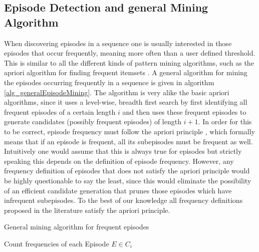 \subsection{Episode Detection and general Mining Algorithm}
When discovering episodes in a sequence one is usually interested in those episodes that occur frequently, meaning more often than a user defined threshold. This is similar to all the different kinds of pattern mining algorithms, such as the apriori algorithm for finding frequent itemsets \cite{agrawal1994fast}. A general algorithm for mining the episodes occurring frequently in a sequence is given in algorithm \ref{alg_generalEpisodeMining}. The algorithm is very alike the basic apriori algorithms, since it uses a level-wise, breadth first search by first identifying all frequent episodes of a certain length $i$ and then uses these frequent episodes to generate candidates (possibly frequent episodes) of length $i+1$. In order for this to be correct, episode frequency must follow the apriori principle \cite{agrawal1994fast}, which formally means that if an episode is frequent, all its subepisodes must be frequent as well. Intuitively one would assume that this is always true for episodes but strictly speaking this depends on the definition of episode frequency. However, any frequency definition of episodes that does not satisfy the apriori principle would be highly questionable to say the least, since this would eliminate the possibility of an efficient candidate generation that prunes those episodes which have infrequent subepisodes. To the best of our knowledge all frequency definitions proposed in the literature satisfy the apriori principle.\newline

\begin{algorithm}[H]
  \caption{General mining algorithm for frequent episodes
    \label{alg_generalEpisodeMining}}
  \begin{algorithmic}[1]
    \Statex
      	\State Count frequencies of each Episode $E \in C_i$
      \EndWhile
      \State {}
    \EndFunction
  \end{algorithmic}
\end{algorithm}


